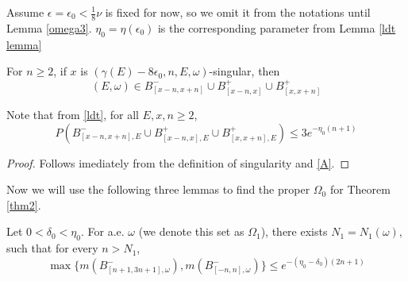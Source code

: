 Assume $\epsilon=\epsilon_0<\frac{1}{8}\nu$ is fixed for now, so we omit it from the notations until Lemma \ref{omega3}. $\eta_0=\eta(\epsilon_0)$ is the corresponding parameter from Lemma \ref{ldt lemma}
\begin{lemma}\label{lemma1}
For $n \geq 2$, if $x$ is $(\gamma(E)-8\epsilon_0,n,E,\omega)$-singular, then
\[(E,\omega)\in B_{[x-n,x+n]}^-\cup B_{[x-n,x]}^+\cup B_{[x,x+n]}^+
\]
\end{lemma}
\begin{remark}
  Note that from \eqref{ldt}, for all $E,x,n\geq 2$,
  \[
    P(B_{[x-n,x+n],E}^-\cup B_{[x-n,x],E}^+\cup B_{[x,x+n],E}^+)\leq 3e^{-\eta_0 (n+1)}
  \]
\end{remark}
\begin{proof}
Follows imediately from the definition of singularity and \eqref{A}.
\end{proof}

Now we will use the following three lemmas to find the proper $\Omega_0$ for Theorem \ref{thm2}.
\begin{lemma}\label{omega1}
  Let $0<\delta_0<\eta_0$. For a.e. $\omega$ (we denote this set as $\Omega_1$), there exists $ N_1=N_1(\omega)$, such that for every $ n>N_1$,
  \[
  \max\{m(B_{[n+1,3n+1],\omega}^-),m(B_{[-n,n],\omega}^-)\}\leq e^{-(\eta_0-\delta_0)(2n+1)}
  \]
\end{lemma}

